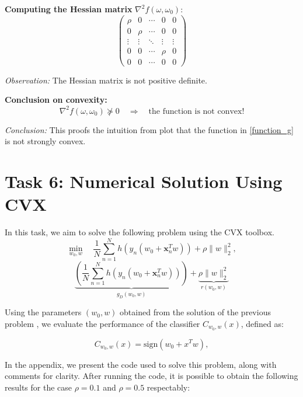 \documentclass[a4paper,12pt]{report}
\begin{document}
\begin{itemize}
\textbf{Computing the Hessian matrix} \( \nabla^2 f(\omega, \omega_0) \):
\begin{equation}
\begin{pmatrix}
\rho & 0 & \cdots & 0 & 0 \\
0 & \rho & \cdots & 0 & 0 \\
\vdots & \vdots & \ddots & \vdots & \vdots \\
0 & 0 & \cdots & \rho & 0 \\
0 & 0 & \cdots & 0 & 0
\end{pmatrix}
\end{equation}

\textit{Observation:} The Hessian matrix is not positive definite.

\textbf{Conclusion on convexity:}
\begin{equation}
\nabla^2 f(\omega, \omega_0) \not\succeq 0 \quad \Rightarrow \quad \text{the function is not convex!}
\end{equation}

\textit{Conclusion:} This proofs the intuition from plot \label{} that the function in \eqref{function_g} is not strongly convex.


    
\end{itemize}


\section{Task 6: Numerical Solution Using CVX}

In this task, we aim to solve  the following problem using the CVX toolbox.
\begin{equation}
\min_{w_0, w} \quad \frac{1}{N} \sum_{n=1}^{N} h\left(y_n\left(w_0 + \mathbf{x}_n^T w\right)\right) + \rho \|w\|_2^2,
\end{equation}
\[
\underbrace{\left( \frac{1}{N} \sum_{n=1}^{N} h\left(y_n \left(w_0 + \mathbf{x}_n^T w\right)\right) \right)}_{g_D(w_0, w)} + \underbrace{\rho \|w\|_2^2}_{r(w_0, w)}
\]

 Using the parameters \((w_0, w)\) obtained from the solution of the previous problem , we evaluate the performance of the classifier \(C_{w_0, w}(x)\), defined as:

\[
C_{w_0, w}(x) = \text{sign}(w_0 + x^T w),
\]

In the appendix, we present the code used to solve this problem, along with comments for clarity.
After running the code, it is possible to obtain the following results for the case $\rho = 0.1$ and $\rho = 0.5$ respectably: \\
\end{document}
